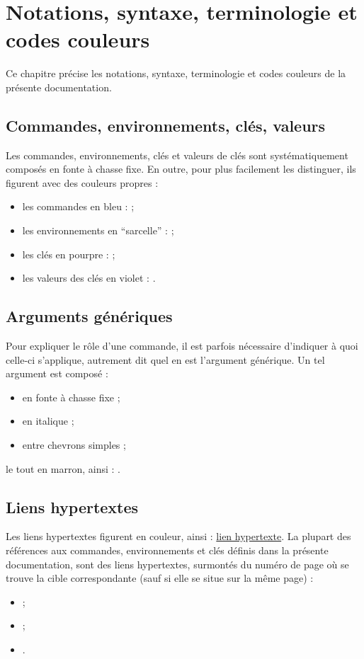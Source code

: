 
\chapter{Notations, syntaxe, terminologie et codes couleurs}\label{cha:synt-term-notat}

Ce chapitre précise les notations, syntaxe, terminologie et codes couleurs de
la présente documentation.


\section{Commandes, environnements, clés, valeurs}\label{sec:comm-envir-cles}

Les commandes, environnements, clés et valeurs de clés sont systématiquement
composés en fonte à chasse fixe. En outre, pour plus facilement les
distinguer, ils figurent avec des couleurs propres :
\begin{itemize}
\item les commandes en bleu :  ;
\item les environnements en \enquote{sarcelle} :
   ;
\item les clés en pourpre :  ;
\item les valeurs des clés en violet : .
\end{itemize}

\section{Arguments génériques}
\label{sec:arguments-generiques}

Pour expliquer le rôle d'une commande, il est parfois nécessaire d'indiquer
à quoi celle-ci s'applique, autrement dit quel en est l'argument générique.
Un tel argument est composé :
\begin{itemize}
\item en fonte à chasse fixe ;
\item en italique ;
\item entre chevrons simples ;
\end{itemize}
le tout en marron, ainsi : .

\section{Liens hypertextes}
\label{sec:liens-hypertextes}

Les liens hypertextes figurent en couleur, ainsi :
\href{http://gte.univ-littoral.fr/members/dbitouze/pub/latex}{lien hypertexte}.
La plupart des références aux commandes, environnements et clés définis dans la
présente documentation, sont des liens hypertextes, surmontés du numéro de page
où se trouve la cible correspondante (sauf si elle se situe sur la même page) :
\begin{itemize}
\item {} ;
\item {} ;
\item {}.
\end{itemize}


